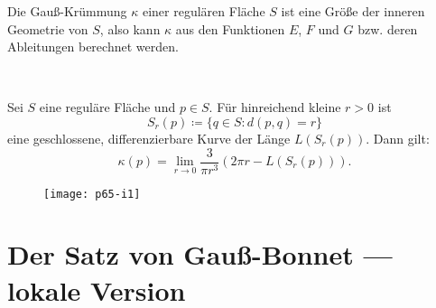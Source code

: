 \begin{example}
\begin{enumerate}
  \end{enumerate}
\end{example}

\begin{theorem}
  Die Gauß-Krümmung $ \kappa $ einer regulären Fläche $ S $ ist eine Größe der inneren Geometrie von $ S $, also kann $ \kappa $ aus den Funktionen $ E $, $ F $ und $ G $ bzw. deren Ableitungen berechnet werden.
\end{theorem}

\begin{theorem}
  \

  \begin{minipage}{.625\textwidth}
    Sei $ S $ eine reguläre Fläche und $ p \in S $. Für hinreichend kleine $ r > 0 $ ist
    \begin{equation*}
      S_r(p) \coloneqq \{ q \in S : d(p,q) = r \}
    \end{equation*}
    eine geschlossene, differenzierbare Kurve der Länge $ L(S_r(p)) $. Dann gilt:
    \begin{equation*}
      \kappa(p) = \lim_{r \to 0} \frac{3}{\pi r^3}(2\pi r - L(S_r(p)))\text{.}
    \end{equation*}
  \end{minipage}
  \hfill
  \begin{minipage}{.35\textwidth}
    \begin{figure}[H]
      \texttt{[image: p65-i1]}
    \end{figure}
  \end{minipage}
\end{theorem}

\section{Der Satz von Gauß-Bonnet --- lokale Version}

